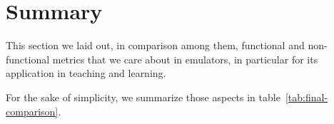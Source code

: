 \section{Summary}
\label{sec:comparativesummary}

This section we laid out, in comparison among them, functional and non-functional metrics that we care about in emulators, in particular for its application in teaching and learning.

For the sake of simplicity, we summarize those aspects in table~\ref{tab:final-comparison}.



